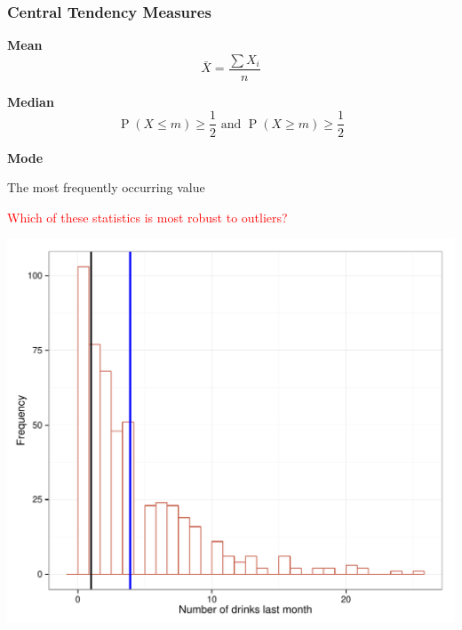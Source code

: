 \documentclass[dvipsnames]{beamer}\usepackage[]{graphicx}\usepackage[]{color}
\makeatletter
\def\maxwidth{ %
  \ifdim\Gin@nat@width>\linewidth
    \linewidth
  \else
    \Gin@nat@width
  \fi
}
\newenvironment{knitrout}{}{} %
\makeatother
\begin{document}
\begin{frame}
\frametitle{Central Tendency Measures}
\begin{center}
\textbf{Mean}
$$
\bar{X} = \frac{\sum X_i}{n}
$$

\textbf{Median}
$$
\operatorname{P}(X\leq m) \geq \frac{1}{2}\text{ and }\operatorname{P}(X\geq m) \geq \frac{1}{2}
$$

\textbf{Mode}

The most frequently occurring value

\vspace{.5cm}
\textcolor{red}{Which of these statistics is most robust to outliers?}
\end{center}
\end{frame}

\begin{frame}
\begin{knitrout}
\color{fgcolor}

{\centering \includegraphics[width=\maxwidth]{figure/unnamed-chunk-6-1} 

}



\end{knitrout}
\end{frame}
\end{document}
